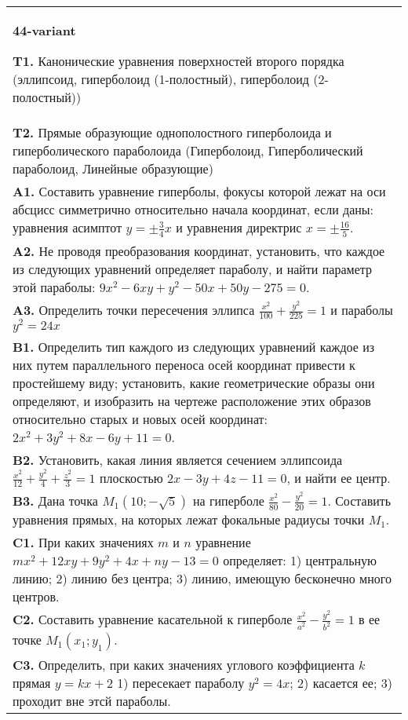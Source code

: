 \documentclass{article}
\begin{document}
\begin{tabular}{m{17cm}}
\textbf{44-variant}
\newline

\textbf{T1.} Канонические уравнения поверхностей второго порядка (эллипсоид, гиперболоид (1-полостный), гиперболоид (2-полостный)) \\
\textbf{T2.} Прямые образующие однополостного гиперболоида и гиперболического параболоида (Гиперболоид, Гиперболический параболоид, Линейные образующие) \\
\textbf{A1.} Составить уравнение гиперболы, фокусы которой лежат на оси абсцисс симметрично относительно начала координат, если даны: уравнения асимптот $y= \pm \frac{3}{4} x$ и уравнения директрис $x= \pm \frac{16}{5}$. \\
\textbf{A2.} Не проводя преобразования координат, установить, что каждое из следующих уравнений определяет параболу, и найти параметр этой параболы: $9 x^2-6 x y+y^2-50 x+50 y-275=0$. \\
\textbf{A3.} Определить точки пересечения эллипса $\frac{x^2}{100}+\frac{y^2}{225}=1$ и параболы $y^2=24 x$ \\
\textbf{B1.} Определить тип каждого из следующих уравнений каждое из них путем параллельного переноса осей координат привести к простейшему виду; установить, какие геометрические образы они определяют, и изобразить на чертеже расположение этих образов относительно старых и новых осей координат: $2 x^2+3 y^2+8 x-6 y+11=0$. \\
\textbf{B2.} Установить, какая линия является сечением эллипсоида $\frac{x^2}{12}+\frac{y^2}{4}+\frac{z^2}{3}=1$ плоскостью $2 x-3 y+4 z-11=0$, и найти ее центр. \\
\textbf{B3.} Дана точка $M_1(10 ;-\sqrt{5})$ на гиперболе $\frac{x^2}{80}-\frac{y^2}{20}=1$. Составить уравнения прямых, на которых лежат фокальные радиусы точки $M_1$. \\
\textbf{C1.} При каких значениях $m$ и $n$ уравнение $m x^2+12 x y+9 y^2+4 x+n y-13=0$ определяет: 1) центральную линию; 2) линию без центра; 3) линию, имеющую бесконечно много центров. \\
\textbf{C2.} Составить уравнение касательной к гиперболе $\frac{x^2}{a^2}-\frac{y^2}{b^2}=1$ в ее точке $M_1\left(x_1 ; y_1\right)$. \\
\textbf{C3.} Определить, при каких значениях углового коэффициента $k$ прямая $y=k x+2$ 1) пересекает параболу $y^2=4 x$; 2) касается ее; 3) проходит вне этсй параболы. \\

\end{tabular}
\vspace{1cm}
\end{document}
